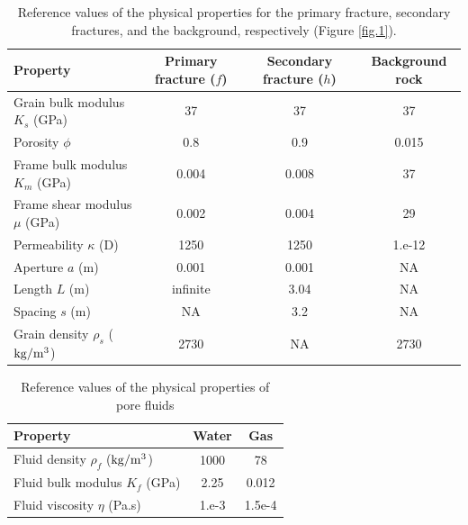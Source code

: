 \documentclass[draft]{agujournal2019}
\begin{document}
\begin{table}[!ht]
  \caption{Reference values of the physical properties for the primary fracture, secondary fractures, and the background, respectively (Figure \ref{fig.1}). }
\begin{center}
  \begin{tabular}{ | l c  c  c | }
    \hline
    Property & Primary fracture ($f$) & Secondary fracture ($h$) & Background rock \\ \hline
    Grain bulk modulus $K_s$ (GPa) & 37 & 37 & 37 \\ 
    Porosity $\phi$ & 0.8 & 0.9 & 0.015 \\ 
    Frame bulk modulus $K_m$ (GPa) &  0.004 & 0.008 & 37\\ 
    Frame shear modulus $\mu$ (GPa) & 0.002 & 0.004 & 29\\
    Permeability $\kappa$ (D) & 1250 & 1250 & 1.e-12\\
    Aperture $a$ (m) & 0.001 & 0.001 & NA\\
    Length $L$ (m) & infinite & 3.04 & NA \\
    Spacing $s$ (m) & NA & 3.2
     & NA \\
    Grain density $\rho_s$ ($\rm{kg/m^3}$) & 2730 & NA & 2730\\ 
    \hline
  \end{tabular}
  \label{table.1}
\end{center}
\end{table}

\begin{table}[!ht]
  \caption{Reference values of the physical properties of pore fluids}
\begin{center}
  \begin{tabular}{ | l  c  c |  }
    \hline
    Property & Water & Gas\\ \hline
    Fluid density $\rho_f$ ($\rm{kg/m^3}$) & 1000 & 78\\
    Fluid bulk modulus $K_f$ (\rm{GPa}) & 2.25 & 0.012\\
    Fluid viscosity $\eta$ (\rm{Pa.s})& 1.e-3 & 1.5e-4\\
    \hline
  \end{tabular}
  \label{table.2}
\end{center}
\end{table}
\end{document}
